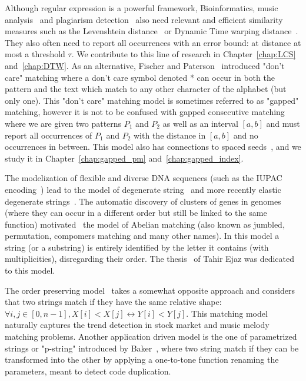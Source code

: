 Although regular expression is a powerful framework, Bioinformatics\cite{Gusfield1997}, music analysis~\cite{mongeau1990comparison} and plagiarism detection~\cite{lukashenko2007computer} also need relevant and efficient similarity measures such as the Levenshtein distance~\cite{levenshtein1966binary} or Dynamic Time warping distance~\cite{sakoe1978dynamic}. They also often need to report all occurrences with an error bound\cite{landau1986efficient,landau1989fast}: at distance at most a threshold $\tau$.
We contribute to this line of research in Chapter~\ref{chap:LCS} and~\ref{chap:DTW}.
As an alternative, Fischer and Paterson~\cite{fischer1974string} introduced "don't care" matching where a don't care symbol denoted * can occur in both the pattern and the text which match to any other character of the alphabet (but only one).
This "don't care" matching model is sometimes referred to as "gapped" matching, however it is not to be confused with gapped consecutive matching~\cite{bille2022gapped} where we are given two patterns $P_1$ and $P_2$ as well as an interval $[a,b]$ and must report all occurrences of $P_1$ and $P_2$ with the distance in $[a,b]$ and no occurrences in between. This model also has connections to spaced seeds~\cite{burkhardt2003better}, and we study it in Chapter~\ref{chap:gapped_pm} and~\ref{chap:gapped_index}.

The modelization of flexible and diverse DNA sequences (such as the IUPAC encoding~\cite{comm1970iupac}) lead to the model of degenerate string~\cite{abrahamson1987generalized} and more recently elastic degenerate strings~\cite{iliopoulos2021efficient}.
The automatic discovery of clusters of genes in genomes (where they can occur in a different order but still be linked to the same function) motivated~\cite{eres2004permutation} the model of Abelian matching (also known as jumbled, permutation, compomers matching and many other names). In this model a string (or a substring) is entirely identified by the letter it contains (with multiplicities), disregarding their order. The thesis~\cite{ejaz2010abelian} of Tahir Ejaz was dedicated to this model.


The order preserving model~\cite{kim2014order,kubica2013linear} takes a somewhat opposite approach and considers that two strings match if they have the same relative shape: $\forall i,j \in [0,n-1], X[i] < X[j] \leftrightarrow Y[i] < Y[j]$. This matching model naturally captures the trend detection in stock market and music melody matching problems.
%
Another application driven model is the one of parametrized strings or "p-string" introduced by Baker~\cite{baker1993theory}, where two string match if they can be transformed into the other by applying a one-to-tone function renaming the parameters, meant to detect code duplication.


